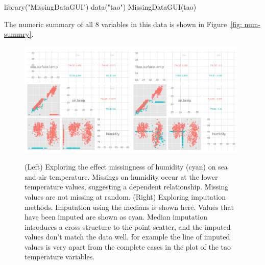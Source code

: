 \documentclass[article]{jss}
\begin{document}
\begin{Code}
library("MissingDataGUI")
data("tao")
MissingDataGUI(tao)
\end{Code}

The numeric summary of all 8 variables in this data is shown in Figure~\ref{fig: num-summry}.


\begin{figure}[htp]
\centerline{\includegraphics[width=0.49\textwidth]{tao1_pairwise.png}\includegraphics[width=0.49\textwidth]{tao2_pairwise.png}}
\caption{(Left) Exploring the effect missingness of humidity (cyan) on sea and air temperature. Missings on humidity occur at the lower temperature values, suggesting a dependent relationship. Missing values are not missing at random. (Right) Exploring imputation methods. Imputation using the medians is shown here. Values that have been imputed are shown as cyan. Median imputation introduces a cross structure to the point scatter, and the imputed values don't match the data well, for example the line of imputed values is very apart from the complete cases in the plot of the tao temperature variables.}
\label{tao1}
\end{figure}
\end{document}
